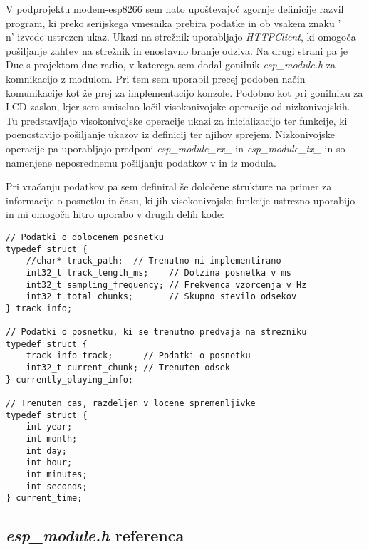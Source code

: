 \documentclass[12pt,a4paper,twoside,openright,slovene]{book}
\begin{document}
V podprojektu modem-esp8266 sem nato upoštevajoč zgornje definicije razvil program, ki preko serijskega vmesnika prebira podatke in ob vsakem znaku '\\n' izvede ustrezen ukaz. Ukazi na strežnik uporabljajo \textit{HTTPClient}, ki omogoča pošiljanje zahtev na strežnik in enostavno branje odziva. Na drugi strani pa je Due s projektom due-radio, v katerega sem dodal gonilnik \textit{esp\_module.h} za komnikacijo z modulom. Pri tem sem uporabil precej podoben način komunikacije kot že prej za implementacijo konzole. Podobno kot pri gonilniku za LCD zaslon, kjer sem smiselno ločil visokonivojske operacije od nizkonivojskih. Tu predstavljajo visokonivojske operacije ukazi za inicializacijo ter funkcije, ki poenostavijo pošiljanje ukazov iz definicij ter njihov sprejem. Nizkonivojske operacije pa uporabljajo predponi \textit{esp\_module\_rx\_} in \textit{esp\_module\_tx\_} in so namenjene neposrednemu pošiljanju podatkov v in iz modula.

Pri vračanju podatkov pa sem definiral še določene strukture na primer za informacije o posnetku in času, ki jih visokonivojske funkcije ustrezno uporabijo in mi omogoča hitro uporabo v drugih delih kode:

\begin{lstlisting}
// Podatki o dolocenem posnetku
typedef struct {
	//char* track_path;  // Trenutno ni implementirano
	int32_t track_length_ms;    // Dolzina posnetka v ms
	int32_t sampling_frequency; // Frekvenca vzorcenja v Hz
	int32_t total_chunks;       // Skupno stevilo odsekov
} track_info;

// Podatki o posnetku, ki se trenutno predvaja na strezniku
typedef struct {
	track_info track;      // Podatki o posnetku
	int32_t current_chunk; // Trenuten odsek
} currently_playing_info;

// Trenuten cas, razdeljen v locene spremenljivke
typedef struct {
	int year;
	int month;
	int day;
	int hour;
	int minutes;
	int seconds;
} current_time;
\end{lstlisting}


\subsection{\textit{esp\_module.h} referenca}
\end{document}
